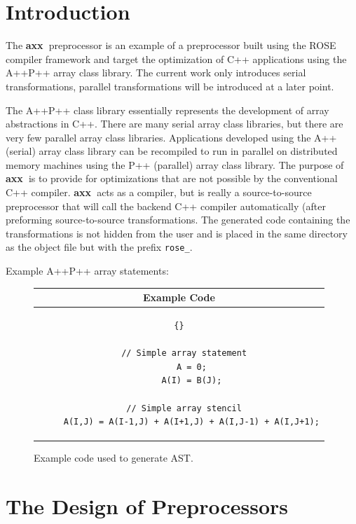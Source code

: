 \documentclass[10pt]{article}
\newcommand{\axx}{{\bf axx\ }}
\begin{document}
\section{Introduction}

    The \axx preprocessor is an example of a preprocessor built using the ROSE compiler framework
and target the optimization of C++ applications using the A++\/P++ array class library.  The current
work only introduces serial transformations, parallel transformations will be introduced at a later
point.

    The A++\/P++ class library essentially represents the development of array abstractions in C++.
There are many serial array class libraries, but there are very few parallel array class libraries.
Applications developed using the A++ (serial) array class library can be recompiled to run in parallel
on distributed memory machines using the P++ (parallel) array class library.  The purpose of \axx is to
provide for optimizations that are not possible by the conventional C++ compiler.  \axx acts as a compiler,
but is really a source-to-source preprocessor that will call the backend C++ compiler automatically (after
preforming source-to-source transformations.  The generated code containing the transformations is not hidden
from the user and is placed in the same directory as the object file but with the prefix {\tt rose\_}.


Example A++\/P++ array statements:

\vspace{0.5in}

\begin{figure}[tb]
\begin{center}
\begin{tabular}{|c|} \hline
 Example Code \\\hline\hline
\begin{lstlisting}{}

  // Simple array statement
     A = 0;
     A(I) = B(J);

  // Simple array stencil
     A(I,J) = A(I-1,J) + A(I+1,J) + A(I,J-1) + A(I,J+1);

\end{lstlisting}
\\\hline
\end{tabular}
\end{center}
\caption{ Example code used to generate AST. }
\label{AST_Code}
\end{figure}

\section{The Design of Preprocessors}
\end{document}
